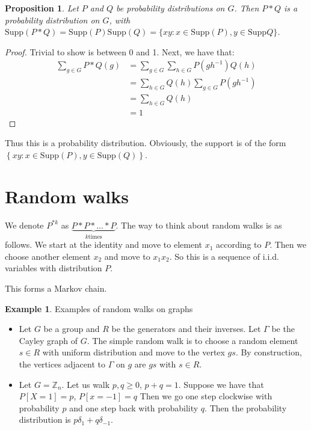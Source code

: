 \documentclass[]{article}
\newtheorem{proposition}[theorem]{Proposition}
\theoremstyle{definition}
\newtheorem{example}[theorem]{Example}
\numberwithin{theorem}{section}
\numberwithin{equation}{section}
\newcommand{\supp}{\text{Supp}}
\begin{document}
\begin{proposition}
	Let $P$ and $Q$ be probability distributions on $G$. Then $P \ast Q$ is a probability distribution on $G$, with $\supp(P \ast Q) = \supp(P)\supp(Q) = \lbrace xy : x \in \supp(P), y \in \supp Q \rbrace$. 
\end{proposition}
\begin{proof}
	Trivial to show is between 0 and 1.
	Next, we have that:
	\begin{align*}
		\sum_{g \in G} P \ast Q(g) &= \sum_{g \in G} \sum_{h \in G} P(gh^{-1}) Q(h)\\
		&=\sum_{h \in G} Q(h) \sum_{g \in G} P(gh^{-1})\\
		&= \sum_{h \in G} Q(h)\\
		&= 1
	\end{align*}
\end{proof}
Thus this is a probability distribution. Obviously, the support is of the form $\left\{ xy : x \in \supp(P), y \in \supp(Q) \right\}$. 

\section{Random walks}
We denote $P^{\ast k}$ as $\underbrace{P \ast P \ast ... \ast P}_{k \text{times}}$. 
The way to think about random walks is as follows. We start at the identity and move to element $x_1$ according to $P$. Then we choose another element $x_2$ and move to $x_1 x_2$. So this is a sequence of i.i.d. variables with distribution $P$.

This forms a Markov chain. 

\begin{example}
	Examples of random walks on graphs
	\begin{itemize}
		\item Let $G$ be a group and $R$ be the generators and their inverses. Let $\Gamma$ be the Cayley graph of $G$. The simple random walk is to choose a random element $s \in R$ with uniform distribution and move to the vertex $gs$. By construction, the vertices adjacent to $\Gamma$ on $g$ are $gs$ with $s \in R$.
		\item Let $G = \mathbb{Z}_n$. Let us walk  $p, q \geq 0$, $p + q = 1$. Suppose we have that $P[X = 1] = p$, $P[x = -1] = q$ Then we go one step clockwise with probability $p$ and one step back with probability $q$. Then the probability distribution is $p \delta_1 + q \delta_{-1}$. 
	\end{itemize}
\end{example}
\end{document}
